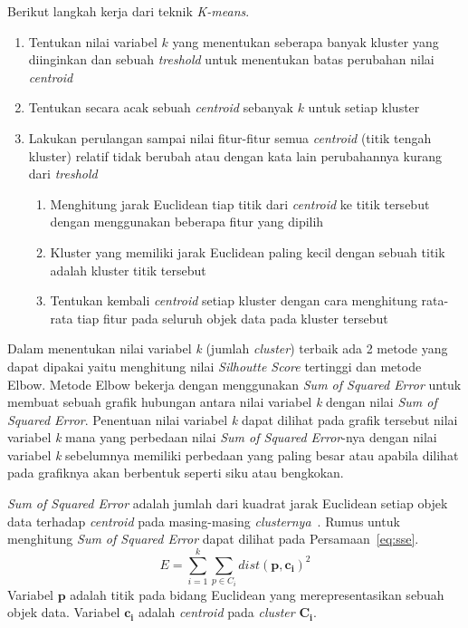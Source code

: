 Berikut langkah kerja dari teknik \textit{K-means}.~\cite{jiawei:12:datmin}
\begin{enumerate}
	\item Tentukan nilai variabel \(k\) yang menentukan seberapa banyak kluster yang diinginkan dan sebuah \textit{treshold} untuk menentukan batas perubahan nilai \textit{centroid}
	\item Tentukan secara acak sebuah \textit{centroid} sebanyak \(k\)  untuk setiap kluster
	\item Lakukan perulangan sampai nilai fitur-fitur semua \textit{centroid} (titik tengah kluster) relatif tidak berubah atau dengan kata lain perubahannya kurang dari \textit{treshold}
	\begin{enumerate}
		\item Menghitung jarak Euclidean tiap titik dari \textit{centroid} ke titik tersebut dengan menggunakan beberapa fitur yang dipilih
		\item Kluster yang memiliki jarak Euclidean paling kecil dengan sebuah titik adalah kluster titik tersebut
		\item Tentukan kembali \textit{centroid} setiap kluster dengan cara menghitung rata-rata tiap fitur pada seluruh objek data pada kluster tersebut
	\end{enumerate}
\end{enumerate}

Dalam menentukan nilai variabel \textit{k} (jumlah \textit{cluster}) terbaik ada 2 metode yang dapat dipakai yaitu menghitung nilai \textit{Silhoutte Score} tertinggi dan metode Elbow. Metode Elbow bekerja dengan menggunakan  \textit{Sum of Squared Error} untuk membuat sebuah grafik hubungan antara nilai variabel \textit{k} dengan nilai \textit{Sum of Squared Error}. Penentuan nilai variabel \textit{k} dapat dilihat pada grafik tersebut nilai variabel \textit{k} mana yang perbedaan nilai \textit{Sum of Squared Error}-nya dengan nilai variabel \textit{k} sebelumnya memiliki perbedaan yang paling besar atau apabila dilihat pada grafiknya akan berbentuk seperti siku atau bengkokan.

\textit{Sum of Squared Error} adalah jumlah dari kuadrat jarak Euclidean setiap objek data terhadap \textit{centroid} pada masing-masing \textit{clusternya}~\cite{jiawei:12:datmin}. Rumus untuk menghitung \textit{Sum of Squared Error} dapat dilihat pada Persamaan~\ref{eq:sse}.
\begin{equation}\label{eq:sse}
	E = \sum^{k}_{i=1} \sum^{}_{p \in C_{i}} dist(\boldsymbol{p,c_{i}})^2
\end{equation}
Variabel \(\boldsymbol{p}\) adalah titik pada bidang Euclidean yang merepresentasikan sebuah objek data. Variabel \(\boldsymbol{c_{i}}\) adalah \textit{centroid} pada \textit{cluster} \(\boldsymbol{C_{i}}\).

